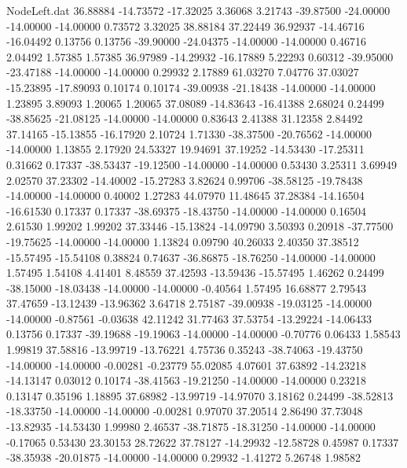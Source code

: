 \begin{filecontents}{NodeLeft.dat}
  36.88884  -14.73572  -17.32025     3.36068    3.21743  -39.87500  -24.00000  -14.00000  -14.00000    0.73572    3.32025   38.88184   37.22449
  36.92937  -14.46716  -16.04492     0.13756    0.13756  -39.90000  -24.04375  -14.00000  -14.00000    0.46716    2.04492    1.57385    1.57385
  36.97989  -14.29932  -16.17889     5.22293    0.60312  -39.95000  -23.47188  -14.00000  -14.00000    0.29932    2.17889   61.03270    7.04776
  37.03027  -15.23895  -17.89093     0.10174    0.10174  -39.00938  -21.18438  -14.00000  -14.00000    1.23895    3.89093    1.20065    1.20065
  37.08089  -14.83643  -16.41388     2.68024    0.24499  -38.85625  -21.08125  -14.00000  -14.00000    0.83643    2.41388   31.12358    2.84492
  37.14165  -15.13855  -16.17920     2.10724    1.71330  -38.37500  -20.76562  -14.00000  -14.00000    1.13855    2.17920   24.53327   19.94691
  37.19252  -14.53430  -17.25311     0.31662    0.17337  -38.53437  -19.12500  -14.00000  -14.00000    0.53430    3.25311    3.69949    2.02570
  37.23302  -14.40002  -15.27283     3.82624    0.99706  -38.58125  -19.78438  -14.00000  -14.00000    0.40002    1.27283   44.07970   11.48645
  37.28384  -14.16504  -16.61530     0.17337    0.17337  -38.69375  -18.43750  -14.00000  -14.00000    0.16504    2.61530    1.99202    1.99202
  37.33446  -15.13824  -14.09790     3.50393    0.20918  -37.77500  -19.75625  -14.00000  -14.00000    1.13824    0.09790   40.26033    2.40350
  37.38512  -15.57495  -15.54108     0.38824    0.74637  -36.86875  -18.76250  -14.00000  -14.00000    1.57495    1.54108    4.41401    8.48559
  37.42593  -13.59436  -15.57495     1.46262    0.24499  -38.15000  -18.03438  -14.00000  -14.00000   -0.40564    1.57495   16.68877    2.79543
  37.47659  -13.12439  -13.96362     3.64718    2.75187  -39.00938  -19.03125  -14.00000  -14.00000   -0.87561   -0.03638   42.11242   31.77463
  37.53754  -13.29224  -14.06433     0.13756    0.17337  -39.19688  -19.19063  -14.00000  -14.00000   -0.70776    0.06433    1.58543    1.99819
  37.58816  -13.99719  -13.76221     4.75736    0.35243  -38.74063  -19.43750  -14.00000  -14.00000   -0.00281   -0.23779   55.02085    4.07601
  37.63892  -14.23218  -14.13147     0.03012    0.10174  -38.41563  -19.21250  -14.00000  -14.00000    0.23218    0.13147    0.35196    1.18895
  37.68982  -13.99719  -14.97070     3.18162    0.24499  -38.52813  -18.33750  -14.00000  -14.00000   -0.00281    0.97070   37.20514    2.86490
  37.73048  -13.82935  -14.53430     1.99980    2.46537  -38.71875  -18.31250  -14.00000  -14.00000   -0.17065    0.53430   23.30153   28.72622
  37.78127  -14.29932  -12.58728     0.45987    0.17337  -38.35938  -20.01875  -14.00000  -14.00000    0.29932   -1.41272    5.26748    1.98582

\end{filecontents}
